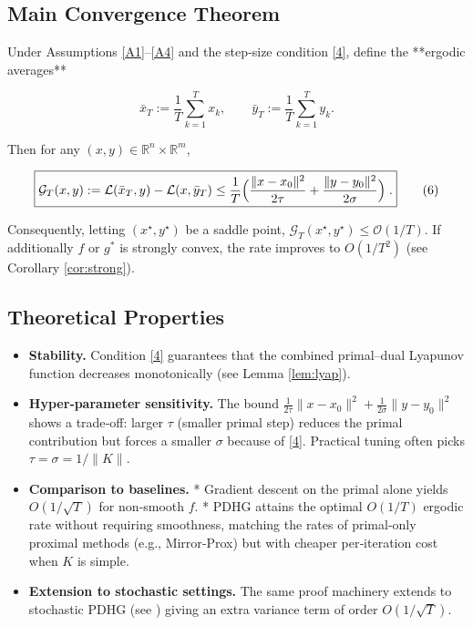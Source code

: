 \documentclass{article}
\begin{document}
\subsection*{Main Convergence Theorem}
\begin{theorem}\label{thm:ergodic}
Under Assumptions \ref{A1}–\ref{A4} and the step‑size condition \eqref{4}, define the **ergodic averages**

\[
\bar{x}_{T}:=\frac{1}{T}\sum_{k=1}^{T}x_{k},\qquad
\bar{y}_{T}:=\frac{1}{T}\sum_{k=1}^{T}y_{k}.
\]

Then for any \((x,y)\in\mathbb{R}^{n}\times\mathbb{R}^{m}\),

\[
\boxed{
\mathcal{G}_{T}(x,y):=
\mathcal{L}(\bar{x}_{T},y)-\mathcal{L}(x,\bar{y}_{T})
\le
\frac{1}{T}\Bigl(
\frac{\|x-x_{0}\|^{2}}{2\tau}
+\frac{\|y-y_{0}\|^{2}}{2\sigma}
\Bigr)
\; .
}
\tag{6}
\]

Consequently, letting \((x^{\star},y^{\star})\) be a saddle point, \(\mathcal{G}_{T}(x^{\star},y^{\star})\le \mathcal{O}(1/T)\).  
If additionally \(f\) or \(g^{*}\) is strongly convex, the rate improves to \(O(1/T^{2})\) (see Corollary \ref{cor:strong}).
\end{theorem}

\subsection*{Theoretical Properties}
\begin{itemize}
\item \textbf{Stability.} Condition \eqref{4} guarantees that the combined primal–dual Lyapunov function decreases monotonically (see Lemma \ref{lem:lyap}).

\item \textbf{Hyper‑parameter sensitivity.} The bound \(\frac{1}{2\tau}\|x-x_{0}\|^{2}+\frac{1}{2\sigma}\|y-y_{0}\|^{2}\) shows a trade‑off: larger \(\tau\) (smaller primal step) reduces the primal contribution but forces a smaller \(\sigma\) because of \eqref{4}. Practical tuning often picks \(\tau=\sigma=1/\|K\|\).

\item \textbf{Comparison to baselines.}  
  * Gradient descent on the primal alone yields \(O(1/\sqrt{T})\) for non‑smooth \(f\).  
  * PDHG attains the optimal \(O(1/T)\) ergodic rate without requiring smoothness, matching the rates of primal‑only proximal methods (e.g., Mirror‑Prox) but with cheaper per‑iteration cost when \(K\) is simple.

\item \textbf{Extension to stochastic settings.} The same proof machinery extends to stochastic PDHG (see \cite{chambolle2018stochastic}) giving an extra variance term of order \(O(1/\sqrt{T})\).

\end{itemize}
\end{document}
